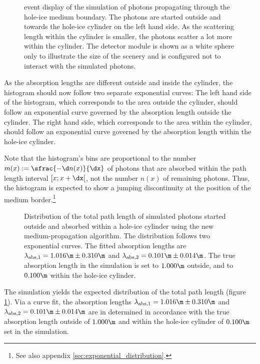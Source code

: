 
\begin{figure}[htbp]
  \caption{\steamshovel event display of the simulation of photons propagating through the hole-ice medium boundary. The photons are started outside and towards the hole-ice cylinder on the left hand side. As the scattering length within the cylinder is smaller, the photons scatter a lot more within the cylinder. The detector module is shown as a white sphere only to illustrate the size of the scenery and is configured not to interact with the simulated photons.}
\end{figure}

As the absorption lengths are different outside and inside the cylinder, the histogram should now follow two separate exponential curves: The left hand side of the histogram, which corresponds to the area outside the cylinder, should follow an exponential curve governed by the absorption length outside the cylinder. The right hand side, which corresponds to the area within the cylinder, should follow an exponential curve governed by the absorption length within the hole-ice cylinder.

Note that the histogram's bins are proportional to the number $m(x):=\sfrac{-\d n(x)}{\dx}$ of photons that are absorbed within the path length interval $[x; x+\dx[$, not the number $n(x)$ of remaining photons. Thus, the histogram is expected to show a jumping discontinuity at the position of the medium border.\footnote{See also appendix \ref{sec:exponential_distribution}.}

\begin{figure}[htbp]
  \caption{Distribution of the total path length of simulated photons started outside and absorbed within a hole-ice cylinder using the new medium-propagation algorithm. The distribution follows two exponential curves. The fitted absorption lengths are $\lambda_\text{abs,1} = 1.016\m \pm 0.310\m$ and $\lambda_\text{abs,2} = 0.101\m \pm 0.014\m$. The true absorption length in the simulation is set to $1.000\m$ outside, and to $0.100\m$ within the hole-ice cylinder.}
  \label{fig:iquo3Ou3}
\end{figure}

The simulation yields the expected distribution of the total path length (figure \ref{fig:iquo3Ou3}). Via a curve fit, the absorption lengths $\lambda_\text{abs,1} = 1.016\m \pm 0.310\m$ and $\lambda_\text{abs,2} = 0.101\m \pm 0.014\m$ are in determined in accordance with the true absorption length outside of $1.000\m$ and within the hole-ice cylinder of $0.100\m$ set in the simulation.

